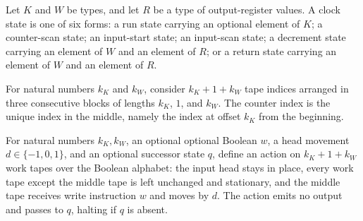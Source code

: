 \begin{definition}
\label{Complexity.TimeHierarchy.ClockState}
\leanok
{}
Let $K$ and $W$ be types, and let $R$ be a type of output-register values. A clock state
is one of six forms: a run state carrying an optional element of $K$; a counter-scan
state; an input-start state; an input-scan state; a decrement state carrying an element
of $W$ and an element of $R$; or a return state carrying an element of $W$ and an
element of $R$.
\end{definition}

\begin{definition}
\label{Complexity.TimeHierarchy.ctrIdx}
\leanok
For natural numbers $k_K$ and $k_W$, consider $k_K+1+k_W$ tape indices arranged in three
consecutive blocks of lengths $k_K$, $1$, and $k_W$. The counter index is the unique
index in the middle, namely the index at offset $k_K$ from the beginning.
\end{definition}

\begin{definition}
\label{Complexity.TimeHierarchy.ctrAction}
\leanok
{}
For natural numbers $k_K,k_W$, an optional optional Boolean $w$, a head movement
$d\in\{-1,0,1\}$, and an optional successor state $q$, define an action on
$k_K+1+k_W$ work tapes over the Boolean alphabet: the input head stays in place, every
work tape except the middle tape is left unchanged and stationary, and the middle tape
receives write instruction $w$ and moves by $d$. The action emits no output and passes
to $q$, halting if $q$ is absent.
\end{definition}

